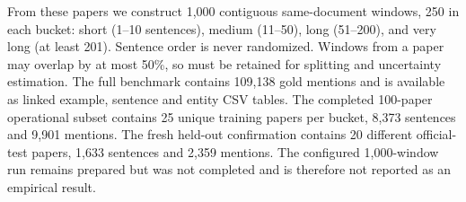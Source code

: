 From these papers we construct 1{,}000 contiguous same-document windows, 250 in
each bucket: short (1--10 sentences), medium (11--50), long (51--200), and very
long (at least 201). Sentence order is never randomized. Windows from a paper
may overlap by at most 50\%, so  must be retained for splitting
and uncertainty estimation. The full benchmark contains 109{,}138 gold mentions
and is available as linked example, sentence and entity CSV tables. The
completed 100-paper operational subset contains 25 unique training papers per
bucket, 8{,}373 sentences and 9{,}901 mentions. The fresh held-out confirmation
contains 20 different official-test papers, 1{,}633 sentences and 2{,}359
mentions. The configured 1{,}000-window run remains prepared but was not
completed and is therefore not reported as an empirical result.
